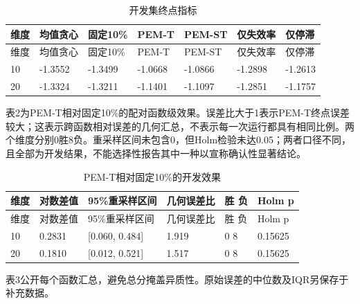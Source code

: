 \documentclass[11pt,a4paper]{article}
\begin{document}
\par\noindent\begin{minipage}{\linewidth}

\begin{longtable}[]{@{}lllllll@{}}
\caption{开发集终点指标}\tabularnewline
\toprule
维度 & 均值贪心 & 固定10\% & PEM-T & PEM-ST & 仅失效率 & 仅停滞 \\
\midrule
\endfirsthead
\toprule
维度 & 均值贪心 & 固定10\% & PEM-T & PEM-ST & 仅失效率 & 仅停滞 \\
\midrule
\endhead
10 & -1.3552 & -1.3499 & -1.0668 & -1.0866 & -1.2898 & -1.2613 \\
20 & -1.3324 & -1.3211 & -1.1401 & -1.1097 & -1.2851 & -1.1757 \\
\bottomrule
\end{longtable}

\end{minipage}\par

表2为PEM-T相对固定10\%的配对函数级效果。误差比大于1表示PEM-T终点误差较大；这表示跨函数相对误差的几何汇总，不表示每一次运行都具有相同比例。两个维度分别0胜8负。重采样区间未包含0，但Holm检验未达0.05；两者口径不同，且全部为开发结果，不能选择性报告其中一种以宣称确认性显著结论。

\par\noindent\begin{minipage}{\linewidth}

\begin{longtable}[]{@{}llllll@{}}
\caption{PEM-T相对固定10\%的开发效果}\tabularnewline
\toprule
维度 & 对数差值 & 95\%重采样区间 & 几何误差比 & 胜 负 & Holm p \\
\midrule
\endfirsthead
\toprule
维度 & 对数差值 & 95\%重采样区间 & 几何误差比 & 胜 负 & Holm p \\
\midrule
\endhead
10 & 0.2831 & {[}0.060, 0.484{]} & 1.919 & 0 8 & 0.15625 \\
20 & 0.1810 & {[}0.012, 0.521{]} & 1.517 & 0 8 & 0.15625 \\
\bottomrule
\end{longtable}

\end{minipage}\par

表3公开每个函数汇总，避免总分掩盖异质性。原始误差的中位数及IQR另保存于补充数据。

\begingroup\small
\end{document}
